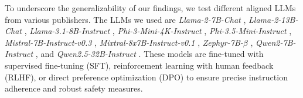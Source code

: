 To underscore the generalizability of our findings, we test different aligned LLMs from various publishers. The LLMs we used are \textit{Llama-2-7B-Chat} \cite{touvron2023llama}, \textit{Llama-2-13B-Chat} \cite{touvron2023llama}, \textit{Llama-3.1-8B-Instruct} \cite{meta2024introducing}, \textit{Phi-3-Mini-4K-Instruct} \cite{abdin2024phi}, \textit{Phi-3.5-Mini-Instruct} \cite{abdin2024phi}, \textit{Mistral-7B-Instruct-v0.3} \cite{jiang2023mistral}, \textit{Mixtral-8x7B-Instruct-v0.1} \cite{jiang2024mixtral}, \textit{Zephyr-7B-$\beta$} \cite{tunstall2023zephyr}, \textit{Qwen2-7B-Instruct} \cite{bai2023qwen}, and \textit{Qwen2.5-32B-Instruct} \cite{yang2024qwen2}. 
These models are fine-tuned with supervised fine-tuning (SFT), reinforcement learning with human feedback (RLHF), or direct preference optimization (DPO) to ensure precise instruction adherence and robust safety measures.



